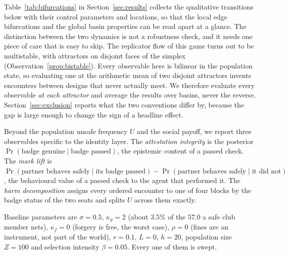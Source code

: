 \documentclass[a4paper,fleqn,longmktitle]{cas-sc}
\theoremstyle{plain}
\theoremstyle{definition}
\begin{document}
Table~\ref{tab:bifurcations} in Section~\ref{sec:results} collects the
qualitative transitions below with their control parameters and locations, so
that the local edge bifurcations and the global basin properties can be read
apart at a glance.
The distinction between the two dynamics is not a robustness check, and it
needs one
piece of care that is easy to skip. The replicator flow of this game turns out
to be multistable, with attractors on disjoint faces of the simplex
(Observation~\ref{prop:bistable}). Every observable here is bilinear in the
population state, so evaluating one at the arithmetic mean of two disjoint
attractors invents encounters between designs that never actually meet. We
therefore evaluate every observable \emph{at each attractor} and average the
results over basins, never the reverse. Section~\ref{sec:exclusion} reports
what the two conventions differ by, because the gap is large enough to change
the sign of a headline effect.

Beyond the population unsafe frequency $U$ and the social payoff, we report
three observables specific to the identity layer. The \emph{attestation
integrity} is the posterior $\Pr(\text{badge genuine} \mid \text{badge
passed})$, the epistemic content of a passed check. The \emph{mark lift} is
$\Pr(\text{partner behaves safely} \mid \text{its badge passed}) -
\Pr(\text{partner behaves safely} \mid \text{it did not})$, the behavioural
value of a passed check to the agent that performed it. The \emph{harm
decomposition} assigns every ordered encounter to one of four blocks by the
badge status of the two seats and splits $U$ across them exactly.

Baseline parameters are $\sigma = 0.5$, $\kappa_g = 2$ (about $3.5\%$ of the
$57.0$ a safe club member nets), $\kappa_f = 0$ (forgery is free, the worst
case), $\rho = 0$ (fines are an instrument, not part of the world), $r = 0.1$,
$L = 0$, $h = 20$, population size $Z = 100$ and selection intensity
$\beta = 0.05$. Every one of them is swept.
\end{document}
